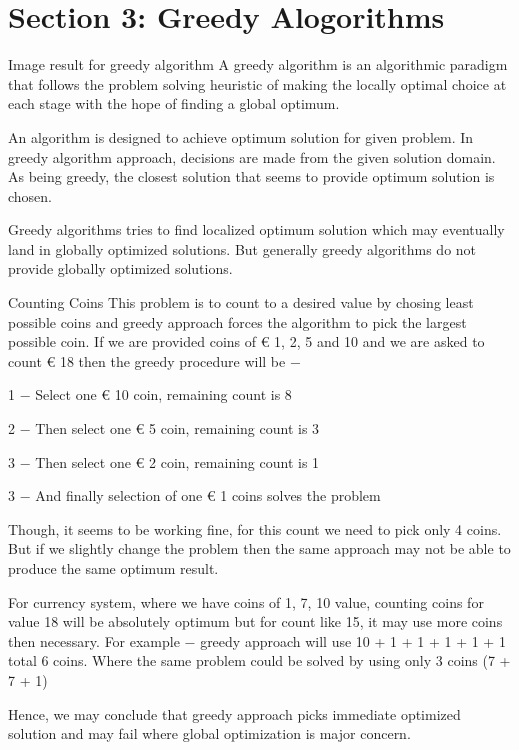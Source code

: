 \documentclass{beamer}
\begin{document}
\section{Section 3: Greedy Alogorithms}
\begin{frame}

Image result for greedy algorithm
A greedy algorithm is an algorithmic paradigm that follows the problem solving heuristic of making the locally optimal choice at each stage with the hope of finding a global optimum.

An algorithm is designed to achieve optimum solution for given problem. In greedy algorithm approach, decisions are made from the given solution domain. As being greedy, the closest solution that seems to provide optimum solution is chosen.

Greedy algorithms tries to find localized optimum solution which may eventually land in globally optimized solutions. But generally greedy algorithms do not provide globally optimized solutions.
\end{frame}
\begin{frame}
Counting Coins
This problem is to count to a desired value by chosing least possible coins and greedy approach forces the algorithm to pick the largest possible coin. If we are provided coins of € 1, 2, 5 and 10 and we are asked to count € 18 then the greedy procedure will be −

1 − Select one € 10 coin, remaining count is 8

2 − Then select one € 5 coin, remaining count is 3

3 − Then select one € 2 coin, remaining count is 1

3 − And finally selection of one € 1 coins solves the problem
\end{frame}
\begin{frame}

Though, it seems to be working fine, for this count we need to pick only 4 coins. But if we slightly change the problem then the same approach may not be able to produce the same optimum result.

For currency system, where we have coins of 1, 7, 10 value, counting coins for value 18 will be absolutely optimum but for count like 15, it may use more coins then necessary. For example − greedy approach will use 10 + 1 + 1 + 1 + 1 + 1 total 6 coins. Where the same problem could be solved by using only 3 coins (7 + 7 + 1)

Hence, we may conclude that greedy approach picks immediate optimized solution and may fail where global optimization is major concern.
\end{frame}
\end{document}
